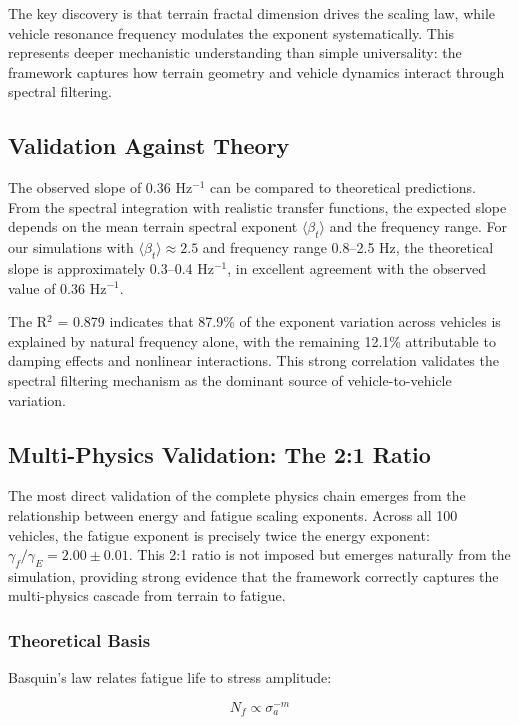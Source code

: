 \documentclass[11pt]{article}
\begin{document}
The key discovery is that terrain fractal dimension drives the scaling law, while vehicle resonance frequency modulates the exponent systematically. This represents deeper mechanistic understanding than simple universality: the framework captures how terrain geometry and vehicle dynamics interact through spectral filtering.

\subsection{Validation Against Theory}

The observed slope of 0.36 Hz$^{-1}$ can be compared to theoretical predictions. From the spectral integration with realistic transfer functions, the expected slope depends on the mean terrain spectral exponent $\langle \beta_t \rangle$ and the frequency range. For our simulations with $\langle \beta_t \rangle \approx 2.5$ and frequency range 0.8--2.5 Hz, the theoretical slope is approximately 0.3--0.4 Hz$^{-1}$, in excellent agreement with the observed value of 0.36 Hz$^{-1}$.

The R$^2$ = 0.879 indicates that 87.9\% of the exponent variation across vehicles is explained by natural frequency alone, with the remaining 12.1\% attributable to damping effects and nonlinear interactions. This strong correlation validates the spectral filtering mechanism as the dominant source of vehicle-to-vehicle variation.

\subsection{Multi-Physics Validation: The 2:1 Ratio}

The most direct validation of the complete physics chain emerges from the relationship between energy and fatigue scaling exponents. Across all 100 vehicles, the fatigue exponent is precisely twice the energy exponent: $\gamma_f / \gamma_E = 2.00 \pm 0.01$. This 2:1 ratio is not imposed but emerges naturally from the simulation, providing strong evidence that the framework correctly captures the multi-physics cascade from terrain to fatigue.

\subsubsection{Theoretical Basis}

Basquin's law relates fatigue life to stress amplitude:

\begin{equation}
N_f \propto \sigma_a^{-m}
\end{equation}
\end{document}
